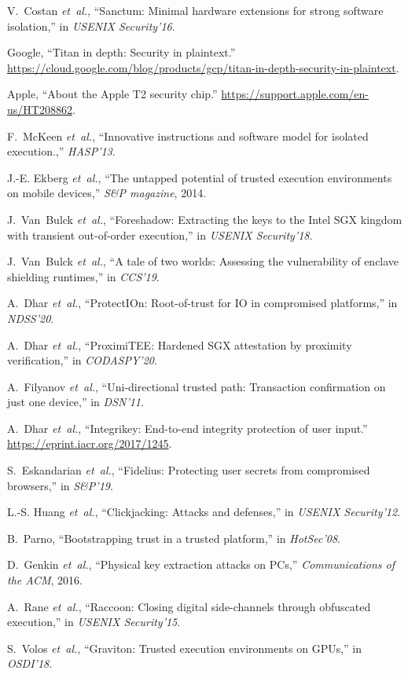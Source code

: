 \documentclass[letterpaper,twocolumn,10pt]{article}
\begin{document}
\begin{thebibliography}{10}

V.~Costan {\em et~al.}, ``Sanctum: Minimal hardware extensions for strong
  software isolation,'' in {\em USENIX Security'16}.

Google, ``Titan in depth: Security in plaintext.''
\newblock
  \url{https://cloud.google.com/blog/products/gcp/titan-in-depth-security-in-plaintext}.

Apple, ``About the {Apple T2} security chip.''
\newblock \url{https://support.apple.com/en-us/HT208862}.

F.~McKeen {\em et~al.}, ``Innovative instructions and software model for
  isolated execution.,'' {\em HASP'13}.

J.-E. Ekberg {\em et~al.}, ``The untapped potential of trusted execution
  environments on mobile devices,'' {\em S\&P magazine}, 2014.

J.~Van~Bulck {\em et~al.}, ``Foreshadow: Extracting the keys to the {Intel SGX}
  kingdom with transient out-of-order execution,'' in {\em USENIX Security'18}.

J.~Van~Bulck {\em et~al.}, ``A tale of two worlds: Assessing the vulnerability
  of enclave shielding runtimes,'' in {\em CCS'19}.

A.~Dhar {\em et~al.}, ``{ProtectIOn}: Root-of-trust for {IO} in compromised
  platforms,'' in {\em NDSS'20}.

A.~Dhar {\em et~al.}, ``{ProximiTEE}: Hardened {SGX} attestation by proximity
  verification,'' in {\em CODASPY'20}.

A.~Filyanov {\em et~al.}, ``Uni-directional trusted path: Transaction
  confirmation on just one device,'' in {\em DSN'11}.

A.~Dhar {\em et~al.}, ``Integrikey: End-to-end integrity protection of user
  input.''
\newblock \url{https://eprint.iacr.org/2017/1245}.

S.~Eskandarian {\em et~al.}, ``Fidelius: Protecting user secrets from
  compromised browsers,'' in {\em S\&P'19}.

L.-S. Huang {\em et~al.}, ``Clickjacking: Attacks and defenses,'' in {\em
  USENIX Security'12}.

B.~Parno, ``Bootstrapping trust in a trusted platform,'' in {\em HotSec'08}.

D.~Genkin {\em et~al.}, ``Physical key extraction attacks on {PCs},'' {\em
  Communications of the ACM}, 2016.

A.~Rane {\em et~al.}, ``Raccoon: Closing digital side-channels through
  obfuscated execution,'' in {\em USENIX Security'15}.

S.~Volos {\em et~al.}, ``Graviton: Trusted execution environments on {GPUs},''
  in {\em OSDI'18}.

\end{thebibliography}
\end{document}
